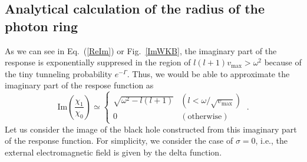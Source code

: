 \documentclass[a4paper,11pt]{article}
\begin{document}
\subsection{Analytical calculation of the radius of the photon ring}
\label{ImagingfromIm}


    As we can see in Eq.~(\ref{ReIm}) or Fig.~\ref{ImWKB}, 
    the imaginary part of the response is exponentially suppresed in the region of $l(l+1) v_\textrm{max} >  \omega^2$ because of the tiny tunneling probability $e^{-\Gamma}$.
    Thus, we would be able to approximate the imaginary part of the respose function as
    \begin{equation}
        \textrm{Im}\left(\frac{\chi_1}{\chi_0}\right) \simeq  
        \begin{cases}
         \sqrt{\omega^2-l(l+1)} & (l <  \omega/\sqrt{v_\text{max}})\\
         0 & (\textrm{otherwise})
        \end{cases}
        \ .
        \label{ImRes}
    \end{equation}
    Let us consider the image of the black hole constructed from this imaginary part of the response function.
    For simplicity, we consider the case of $\sigma=0$, i.e., the external electromagnetic field is given by the delta function. 
\end{document}
